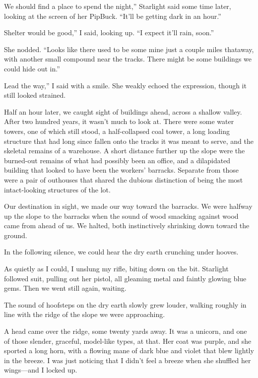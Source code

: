 \leavevmode{}We should find a place to spend the night,” Starlight said some time later, looking at the screen of her PipBuck. “It’ll be getting dark in an hour.”

\leavevmode{}Shelter would be good,” I said, looking up. “I expect it’ll rain, soon.”

She nodded. “Looks like there used to be some mine just a couple miles thataway, with another small compound near the tracks. There might be some buildings we could hide out in.”

\leavevmode{}Lead the way,” I said with a smile. She weakly echoed the expression, though it still looked strained.

Half an hour later, we caught sight of buildings ahead, across a shallow valley. After two hundred years, it wasn’t much to look at. There were some water towers, one of which still stood, a half-collapsed coal tower, a long loading structure that had long since fallen onto the tracks it was meant to serve, and the skeletal remains of a warehouse. A short distance further up the slope were the burned-out remains of what had possibly been an office, and a dilapidated building that looked to have been the workers’ barracks. Separate from those were a pair of outhouses that shared the dubious distinction of being the most intact-looking structures of the lot.

Our destination in sight, we made our way toward the barracks. We were halfway up the slope to the barracks when the sound of wood smacking against wood came from ahead of us. We halted, both instinctively shrinking down toward the ground.

In the following silence, we could hear the dry earth crunching under hooves.

As quietly as I could, I unslung my rifle, biting down on the bit. Starlight followed suit, pulling out her pistol, all gleaming metal and faintly glowing blue gems. Then we went still again, waiting.

The sound of hoofsteps on the dry earth slowly grew louder, walking roughly in line with the ridge of the slope we were approaching.

A head came over the ridge, some twenty yards away. It was a unicorn, and one of those slender, graceful, model-like types, at that. Her coat was purple, and she sported a long horn, with a flowing mane of dark blue and violet that blew lightly in the breeze. I was just noticing that I didn’t feel a breeze when she shuffled her wings—and I locked up.

